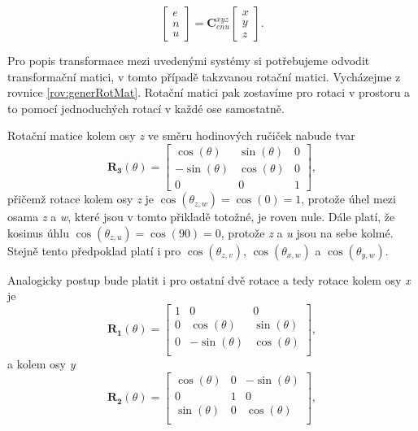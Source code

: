 \documentclass[11pt,a4paper]{article}
\begin{document}
\begin{equation}
\begin{bmatrix}
e \\
n \\
u
\end{bmatrix} = 
\mathbf{C}_{enu}^{xyz}
\begin{bmatrix}
x \\
y \\
z
\end{bmatrix}.
\label{rov:ecef2enu1}
\end{equation}

Pro popis transformace mezi uvedenými systémy si potřebujeme odvodit transformační matici, v tomto případě takzvanou rotační matici. Vycházejme z rovnice \ref{rov:generRotMat}. Rotační matici pak zostavíme pro rotaci v prostoru a to pomocí jednoduchých rotací v každé ose samostatně.

Rotační matice kolem osy \textit{z} ve směru hodinových ručiček nabude tvar
\begin{equation}
\mathbf{R_{3}}\left(\theta\right) = 
\begin{bmatrix}
\cos{\left(\theta\right)} & \sin{\left(\theta\right)} & 0 \\
-\sin{\left(\theta\right)} & \cos{\left(\theta\right)} & 0 \\
0 & 0 & 1
\end{bmatrix},
\end{equation}
přičemž rotace kolem osy \textit{z} je $\cos{\left(\theta_{z, w} \right)} = \cos{\left(0\right)} = 1$, protože úhel mezi osama \textit{z} a \textit{w}, které jsou v tomto přikladě totožné, je roven nule. Dále platí, že kosinus úhlu $ \cos{\left(\theta_{z, u} \right)}= \cos{\left(90\right)} = 0 $, protože \textit {z} a \textit {u} jsou na sebe kolmé. Stejně tento předpoklad platí i pro $\cos{\left(\theta_{z,v}\right)}$, $\cos{\left(\theta_{x,w}\right)}$ a $\cos{\left(\theta_{y,w}\right)}$.

Analogicky postup bude platit i pro ostatní dvě rotace a tedy rotace kolem osy \textit{x} je
\begin{equation}
\mathbf{R_{1}}\left(\theta\right) = 
\begin{bmatrix}
1 & 0 & 0 \\
0 &  \cos{\left(\theta\right)} & \sin{\left(\theta\right)} \\
0 & -\sin{\left(\theta\right)} & \cos{\left(\theta\right)} \\
\end{bmatrix},
\end{equation}
a kolem osy \textit{y}
\begin{equation}
\mathbf{R_{2}}\left(\theta\right) = 
\begin{bmatrix}
\cos{\left(\theta\right)} & 0 & -\sin{\left(\theta\right)} \\
0 & 1 & 0 \\
\sin{\left(\theta\right)} & 0 & \cos{\left(\theta\right)} \\
\end{bmatrix},
\end{equation}
\end{document}

